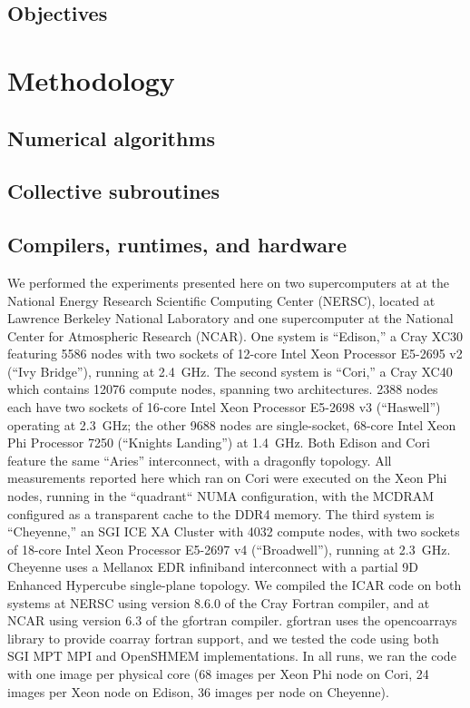 \subsection{Objectives}

\section{Methodology}
\subsection{Numerical algorithms}
\subsection{Collective subroutines}
\subsection{Compilers, runtimes, and hardware}

We performed the experiments presented here on two supercomputers at at the National Energy Research Scientific Computing Center (NERSC), 
located at Lawrence Berkeley National Laboratory and one supercomputer at the National Center for Atmospheric Research (NCAR). 
One system is ``Edison,'' a Cray XC30 featuring 5586 nodes with two sockets of 12-core Intel Xeon Processor E5-2695 v2 (``Ivy Bridge''), running at \num{2.4}~\si{\giga\hertz}.
The second system is ``Cori,'' a Cray XC40 which contains \num{12076} compute nodes, spanning two architectures. \num{2388} nodes each have two sockets of 16-core Intel Xeon Processor E5-2698 v3 (``Haswell'') operating at \num{2.3}~\si{\giga\hertz}; the other \num{9688} nodes are single-socket, 68-core Intel Xeon Phi Processor 7250 (``Knights Landing'') at \num{1.4}~\si{\giga\hertz}.
Both Edison and Cori feature the same ``Aries'' interconnect, with a dragonfly topology.
All measurements reported here which ran on Cori were executed on the Xeon Phi nodes, running in the ``quadrant`` NUMA configuration, with the MCDRAM configured as a transparent cache to the DDR4 memory.
The third system is ``Cheyenne,'' an SGI ICE XA Cluster with \num{4032} compute nodes, with two sockets of 18-core Intel Xeon Processor E5-2697 v4 (``Broadwell''), running at \num{2.3}~\si{\giga\hertz}.
Cheyenne uses a Mellanox EDR infiniband interconnect with a partial 9D Enhanced Hypercube single-plane topology. 
We compiled the ICAR code on both systems at NERSC using version 8.6.0 of the Cray Fortran compiler, and at NCAR using version 6.3 of the gfortran compiler. 
gfortran uses the opencoarrays library to provide coarray fortran support, and we tested the code using both SGI MPT MPI and OpenSHMEM implementations. 
In all runs, we ran the code with one image per physical core (68 images per Xeon Phi node on Cori, 24 images per Xeon node on Edison, 36 images per node on Cheyenne).

